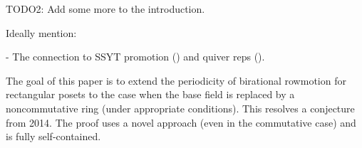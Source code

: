 \documentclass[numbers=enddot,12pt,final,onecolumn,notitlepage]{scrartcl}%
\theoremstyle{definition}
\newenvironment{noncompile}{}{}
\begin{document}




\begin{noncompile}
TODO2: Add some more to the introduction.

Ideally mention:

- The connection to SSYT promotion (\cite[Proposition A.9]{Hopkin20}) and
quiver reps (\cite{GaPaTh18}).




\end{noncompile}

The goal of this paper is to extend the periodicity of birational rowmotion
for rectangular posets to the case when the base field is replaced by a
noncommutative ring (under appropriate conditions). This resolves a conjecture
from 2014. The proof uses a novel approach (even in the commutative case) and
is fully self-contained.
\end{document}
